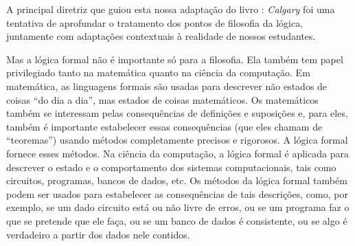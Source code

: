 A principal diretriz que guiou esta nossa adaptação do livro \forallx: \emph{Calgary} foi uma tentativa de aprofundar o tratamento dos pontos de filosofia da lógica, juntamente com adaptações contextuais à realidade de nossos estudantes.


Mas a lógica formal não é importante só para a filosofia.
Ela também tem papel privilegiado tanto na matemática quanto na ciência da computação.
Em matemática, as linguagens formais são usadas para descrever não estados de coisas ``do dia a dia'', mas estados de coisas matemáticos.
Os matemáticos também se interessam pelas consequências de definições e suposições e, para eles, também é importante estabelecer essas consequências (que eles chamam de ``teoremas'') usando métodos completamente precisos e rigorosos.
A lógica formal fornece esses métodos.
Na ciência da computação, a lógica formal é aplicada para descrever o estado e o comportamento dos sistemas computacionais, tais como circuitos, programas, bancos de dados, etc.
Os métodos da lógica formal também podem ser usados para estabelecer as consequências de tais descrições, como, por exemplo, se um dado circuito está ou não livre de erros, ou se um programa faz o que se pretende que ele faça, ou se um banco de dados é consistente, ou se algo é verdadeiro a partir dos dados nele contidos.

